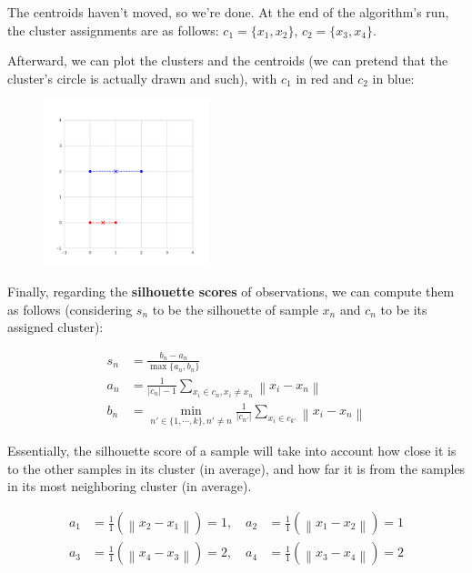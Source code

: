 \documentclass[12pt]{article}
\begin{document}
\begin{enumerate}[leftmargin=\labelsep]
  The centroids haven't moved, so we're done. At the end of the algorithm's run,
  the cluster assignments are as follows: $c_1 = \{x_1, x_2\}$, $c_2 = \{x_3, x_4\}$.

  Afterward, we can plot the clusters and the centroids (we can pretend that the
  cluster's circle is actually drawn and such), with $c_1$ in red and $c_2$ in blue:

  \begin{figure}[H]
    \centering
    \includegraphics[width=0.43\textwidth]{assets/k-means-clusters.png}
    \label{fig:ex-1}
  \end{figure}

  Finally, regarding the \textbf{silhouette scores} of observations, we can compute them as follows
  (considering $s_n$ to be the silhouette of sample $x_n$ and $c_n$ to be its assigned cluster):

  \begin{equation*}
    \begin{aligned}
      s_n & = \frac{b_n - a_n}{\max\{a_n, b_n\}}                                                                            \\
      a_n & = \frac{1}{|c_n| - 1} \sum_{x_i \in c_n, x_i \neq x_n} \left\| x_i - x_n \right\|                               \\
      b_n & = \min_{n' \in \{1, \cdots, k\}, n' \neq n} \frac{1}{|c_{n'}|} \sum_{x_i \in c_{k'}} \left\| x_i - x_n \right\|
    \end{aligned}
  \end{equation*}

  Essentially, the silhouette score of a sample will take into account how close it is to
  the other samples in its cluster (in average), and how far it is from the samples in its
  most neighboring cluster (in average).

  \begin{equation*}
    \begin{aligned}
      a_1 & = \frac{1}{1} \left( \left\| x_2 - x_1 \right\| \right) =  1, \quad
      a_2 & = \frac{1}{1} \left( \left\| x_1 - x_2 \right\| \right) =  1        \\
      a_3 & = \frac{1}{1} \left( \left\| x_4 - x_3 \right\| \right) =  2, \quad
      a_4 & = \frac{1}{1} \left( \left\| x_3 - x_4 \right\| \right) = 2
    \end{aligned}
  \end{equation*}


\end{enumerate}
\end{document}
